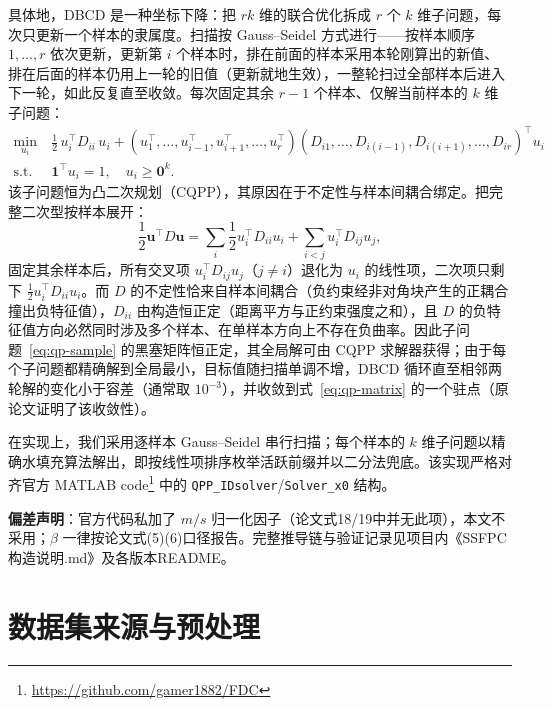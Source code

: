 \documentclass[11pt,a4paper]{ctexart}
\begin{document}
\begin{enumerate}[label=(\arabic*)]
		具体地，DBCD 是一种坐标下降：把 $rk$ 维的联合优化拆成 $r$ 个 $k$ 维子问题，每次只更新一个样本的隶属度。扫描按 Gauss--Seidel 方式进行——按样本顺序 $1,\ldots,r$ 依次更新，更新第 $i$ 个样本时，排在前面的样本采用本轮刚算出的新值、排在后面的样本仍用上一轮的旧值（更新就地生效），一整轮扫过全部样本后进入下一轮，如此反复直至收敛。每次固定其余 \(r-1\) 个样本、仅解当前样本的 \(k\) 维子问题：
		\begin{equation}\label{eq:qp-sample}
			\begin{aligned}
				\min_{u_i}\ & \frac{1}{2}\,u_i^{\top} D_{ii}\, u_i
				+ (u_1^{\top}, \ldots, u_{i-1}^{\top}, u_{i+1}^{\top}, \ldots, u_r^{\top})
				(D_{i1}, \ldots, D_{i(i-1)}, D_{i(i+1)}, \ldots, D_{ir})^{\top} u_i \\
				\text{s.t.}\ & \mathbf{1}^{\top} u_i = 1, \quad u_i \ge \mathbf{0}^{k}.
			\end{aligned}
		\end{equation}
		该子问题恒为凸二次规划（CQPP），其原因在于不定性与样本间耦合绑定。把完整二次型按样本展开：
		\[
		\frac{1}{2}\mathbf{u}^{\top}D\mathbf{u}
		= \sum_{i}\frac{1}{2}u_i^{\top}D_{ii}u_i + \sum_{i<j}u_i^{\top}D_{ij}u_j,
		\]
		固定其余样本后，所有交叉项 \(u_i^{\top}D_{ij}u_j\)（\(j\neq i\)）退化为 \(u_i\) 的线性项，二次项只剩下 \(\frac{1}{2}u_i^{\top}D_{ii}u_i\)。而 \(D\) 的不定性恰来自样本间耦合（负约束经非对角块产生的正耦合撞出负特征值），\(D_{ii}\) 由构造恒正定（距离平方与正约束强度之和），且 \(D\) 的负特征值方向必然同时涉及多个样本、在单样本方向上不存在负曲率。因此子问题~\eqref{eq:qp-sample} 的黑塞矩阵恒正定，其全局解可由 CQPP 求解器获得；由于每个子问题都精确解到全局最小，目标值随扫描单调不增，DBCD 循环直至相邻两轮解的变化小于容差（通常取 \(10^{-3}\)），并收敛到式~\eqref{eq:qp-matrix} 的一个驻点（原论文证明了该收敛性）。
		
		在实现上，我们采用逐样本 Gauss--Seidel 串行扫描；每个样本的 \(k\) 维子问题以精确水填充算法解出，即按线性项排序枚举活跃前缀并以二分法兜底。该实现严格对齐官方 MATLAB code\footnote{\url{https://github.com/gamer1882/FDC}} 中的 \texttt{QPP\_IDsolver}/\texttt{Solver\_x0} 结构。
	\end{enumerate}
	
	\textbf{偏差声明}：官方代码私加了 $m/s$ 归一化因子（论文式18/19中并无此项），本文不采用；$\beta$ 一律按论文式(5)(6)口径报告。完整推导链与验证记录见项目内《SSFPC构造说明.md》及各版本README。
	
	\section{数据集来源与预处理}
	
\end{document}
